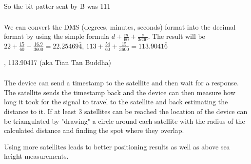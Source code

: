 \documentclass[12pt]{article}
\newcommand{\multipartexercise}{\addtocounter{subsection}{1}\setcounter{subsubsection}{0}}
\newcommand{\exercisepart}{\subsubsection{}}
\begin{document}
\bigskip
\noindent
So the bit patter sent by B was 111

\multipartexercise
\exercisepart
We can convert the DMS (degrees, minutes, seconds) format into the decimal format by using the simple formula $d + \frac{m}{60} + \frac{s}{3600}$. The result will be $22 + \frac{15}{60} + \frac{16.9}{3600} = 22.25469\overline{4}$, $113 + \frac{54}{60} + \frac{15}{3600} = 113.9041\overline{6}$

\bigskip
{}, 113.90417 (aka Tian Tan Buddha)

\exercisepart
The device can send a timestamp to the satellite and then wait for a response. The satellite sends the timestamp back and the device can then measure how long it took for the signal to travel to the satellite and back estimating the distance to it. If at least 3 satellites can be reached the location of the device can be triangulated by "drawing" a circle around each satellite with the radius of the calculated distance and finding the spot where they overlap.

Using more satellites leads to better positioning results as well as above sea height measurements.
\end{document}
